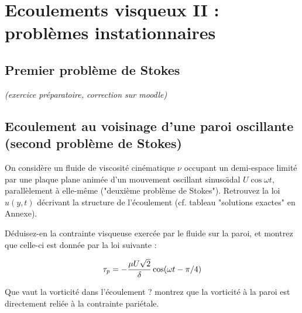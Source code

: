 
\setcounter{section}{4}

\section{Ecoulements visqueux II : problèmes instationnaires}

\setcounter{subsection}{-1}

\subsection{Premier problème de Stokes} 

{\em (exercice préparatoire, correction sur moodle)} 




\subsection{Ecoulement au voisinage d'une paroi oscillante (second problème de Stokes)} \label{2pbStokes}

On consid\`ere un fluide de viscosit\'e cin\'ematique $\nu$ occupant un demi-espace 
limit\'e par une plaque plane anim\'ee d'un mouvement oscillant sinuso\"{\i}dal $U \cos \omega t$, 
parall\`element \`a elle-m\^eme ("deuxi\`eme probl\`eme de Stokes"). 
Retrouvez la loi $u(y,t)$ décrivant la structure de l'écoulement (cf. tableau "solutions exactes" en Annexe).

Déduisez-en la contrainte visqueuse exercée par le fluide sur la paroi, et montrez que celle-ci est donnée par la loi suivante :

\[
\color{black}{\tau_p  = - \frac{\mu U \sqrt{2}}{\delta} \cos (\omega t - \pi/4)}
\]

Que vaut la vorticité dans l'écoulement ? montrez que la vorticité à la paroi est directement reliée à la contrainte pariétale.




